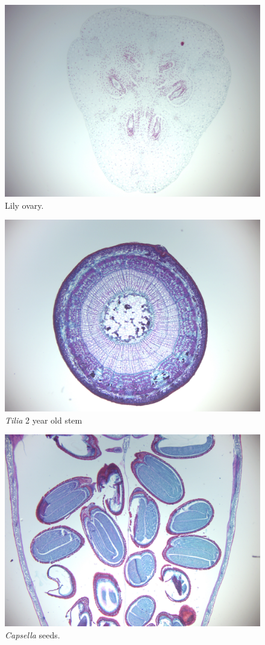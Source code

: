 \begin{figure}

{\centering \includegraphics[width=0.7\linewidth]{./figures/gymnosperms/lily_ovary}

}

\caption{Lily ovary.}\label{fig:liliovary}
\end{figure}

\begin{figure}

{\centering \includegraphics[width=0.7\linewidth]{./figures/gymnosperms/tilia}

}

\caption{\emph{Tilia} 2 year old stem}\label{fig:tilia}
\end{figure}

\begin{figure}

{\centering \includegraphics[width=0.7\linewidth]{./figures/gymnosperms/capsella_embryo}

}

\caption{\emph{Capsella} seeds.}\label{fig:capsella}
\end{figure}

